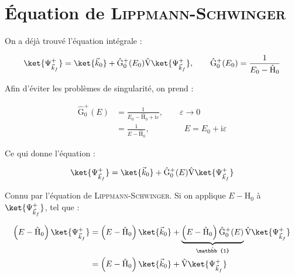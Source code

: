 \documentclass[12pt,a4paper,oneside,french]{book}
\renewcommand{\i}{\mathrm{i}}
\newcommand{\opr}[1]{\mathrm{\hat{#1}}}
\newcommand{\identity}{\mathbb{1}}
\theoremstyle{definition}
\theoremstyle{definition}
\theoremstyle{definition}
\theoremstyle{remark}
\theoremstyle{definition}
\begin{document}
    \section{Équation de \textsc{Lippmann-Schwinger}}
    On a déjà trouvé l'équation intégrale :
    
    \begin{equation*}
        \ket{{\Psi}_{{\vec{k}}_{f}}^{+}} = \ket{{\vec{k}}_{0} \vphantom{{\Psi}_{{\vec{k}}_{f}}^{+}}} + {\opr{G}}_{0}^{+}({E}_{0}) \opr{V} \ket{{\Psi}_{{\vec{k}}_{f}}^{+}}, \qquad {\opr{G}}_{0}^{+}({E}_{0}) = \frac{1}{{E}_{0} - {\opr{H}}_{0}}
    \end{equation*}
    
    Afin d'éviter les problèmes de singularité, on prend : 
    
    \begin{equation*}
    \begin{split}
        {\opr{G}}_{0}^{+}(E) 
        &= \frac{1}{{E}_{0} - {\opr{H}}_{0} + \i \varepsilon}, \qquad \varepsilon \to 0 \\
        &= \frac{1}{E - {\opr{H}}_{0}}, \qquad\qquad \ E = {E}_{0} + \i \varepsilon
    \end{split}
    \end{equation*}
    
    Ce qui donne l'équation :
    
    \begin{equation*}
        \ket{{\Psi}_{{\vec{k}}_{f}}^{+}} = \ket{{\vec{k}}_{0} \vphantom{{\Psi}_{{\vec{k}}_{f}}^{+}}} + {\opr{G}}_{0}^{+}(E) \opr{V} \ket{{\Psi}_{{\vec{k}}_{f}}^{+}}
    \end{equation*}
    
    Connu par l'équation de \textsc{Lippmann-Schwinger}. Si on applique $E - {\opr{H}}_{0}$ à $\ket{{\Psi}_{{\vec{k}}_{f}}^{+}}$, tel que :
    
    \begin{equation*}
    \begin{split}
        \left(E - {\opr{H}}_{0}\right) \ket{{\Psi}_{{\vec{k}}_{f}}^{+}} 
            &= \left(E - {\opr{H}}_{0}\right) \ket{{\vec{k}}_{0} \vphantom{{\Psi}_{{\vec{k}}_{f}}^{+}}} + \underbrace{\left(E - {\opr{H}}_{0}\right) {\opr{G}}_{0}^{+}(E)}_{\opr{\identity}} \opr{V} \ket{{\Psi}_{{\vec{k}}_{f}}^{+}} \\
            &= \left(E - {\opr{H}}_{0}\right) \ket{{\vec{k}}_{0} \vphantom{{\Psi}_{{\vec{k}}_{f}}^{+}}} + \opr{V} \ket{{\Psi}_{{\vec{k}}_{f}}^{+}} \\
    \end{split}
    \end{equation*}
    
\end{document}
